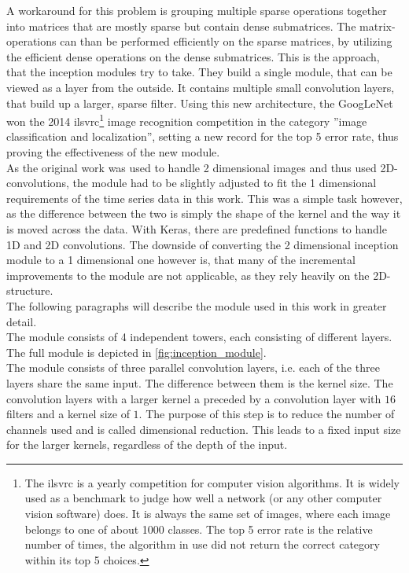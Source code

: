 A workaround for this problem is grouping multiple sparse operations together into matrices that are mostly sparse but contain dense submatrices. The matrix-operations can than be performed efficiently on the sparse matrices, by utilizing the efficient dense operations on the dense submatrices. This is the approach, that the inception modules try to take. They build a single module, that can be viewed as a layer from the outside. It contains multiple small convolution layers, that build up a larger, sparse filter. Using this new architecture, the GoogLeNet won the 2014 \gls{ilsvrc}\footnote{The \gls{ilsvrc} is a yearly competition for computer vision algorithms. It is widely used as a benchmark to judge how well a network (or any other computer vision software) does. It is always the same set of images, where each image belongs to one of about 1000 classes. The top 5 error rate is the relative number of times, the algorithm in use did not return the correct category within its top 5 choices.} image recognition competition in the category ''image classification and localization'', setting a new record for the top 5 error rate, thus proving the effectiveness of the new module. \cite{inception_module, ILSVRC15}\\
As the original work was used to handle 2 dimensional images and thus used 2D-convolutions, the module had to be slightly adjusted to fit the 1 dimensional requirements of the time series data in this work. This was a simple task however, as the difference between the two is simply the shape of the kernel and the way it is moved across the data. With Keras, there are predefined functions to handle 1D and 2D convolutions. The downside of converting the 2 dimensional inception module to a 1 dimensional one however is, that many of the incremental improvements to the module are not applicable, as they rely heavily on the 2D-structure. \cite{inception_v2_v3, inception_v4}\medskip\\
The following paragraphs will describe the module used in this work in greater detail.\\
The module consists of 4 independent towers, each consisting of different layers. The full module is depicted in \autoref{fig:inception_module}.\\
The module consists of three parallel convolution layers, i.e. each of the three layers share the same input. The difference between them is the kernel size. The convolution layers with a larger kernel a preceded by a convolution layer with $16$ filters and a kernel size of $1$. The purpose of this step is to reduce the number of channels used and is called dimensional reduction. This leads to a fixed input size for the larger kernels, regardless of the depth of the input. 
